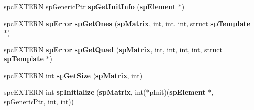\begin{CompactItemize}
\item 
spc\-EXTERN sp\-Generic\-Ptr {\bf sp\-Get\-Init\-Info} ({\bf sp\-Element} $\ast$)
\item 
spc\-EXTERN {\bf sp\-Error} {\bf sp\-Get\-Ones} ({\bf sp\-Matrix}, int, int, int, struct {\bf sp\-Template} $\ast$)
\item 
spc\-EXTERN {\bf sp\-Error} {\bf sp\-Get\-Quad} ({\bf sp\-Matrix}, int, int, int, int, struct {\bf sp\-Template} $\ast$)
\item 
spc\-EXTERN int {\bf sp\-Get\-Size} ({\bf sp\-Matrix}, int)
\item 
{}
spc\-EXTERN int {\bf sp\-Initialize} ({\bf sp\-Matrix}, int($\ast$p\-Init)({\bf sp\-Element} $\ast$, sp\-Generic\-Ptr, int, int))\label{spMatrix_8h_a41}


\end{CompactItemize}
